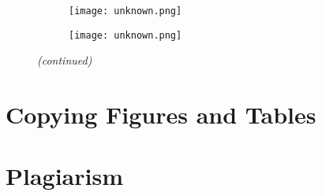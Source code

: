 \begin{figure}[htbp]
\ContinuedFloat
    \centering
    \begin{subfigure}[t]{\textwidth}
          \begin{minipage}[t]{0.49\linewidth}
            \centering
            \texttt{[image: unknown.png]}
          \end{minipage}
          \hfill
          \begin{minipage}[t]{0.49\linewidth}
            \centering
            \texttt{[image: unknown.png]}
          \end{minipage}
        \caption{}\label{fig:add_label}
    \end{subfigure}
    \captionsetup{list=no}
    \caption{\emph{(continued)}}
\end{figure}

\section{Copying Figures and Tables}


\section{Plagiarism}

